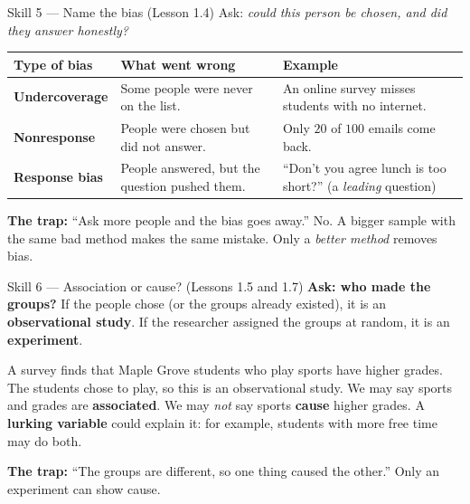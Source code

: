 \documentclass[10pt]{article}
\begin{document}
\vspace{3pt}
\boxguard[16]
\begin{notesbox}{Skill 5 --- Name the bias (Lesson 1.4)}
\small
Ask: \emph{could this person be chosen, and did they answer honestly?}

\vspace{2pt}
\renewcommand{\arraystretch}{1.2}
\begin{tabularx}{\linewidth}{@{} >{\bfseries}p{2.6cm} X X @{}}
\rowcolor{frost}
\textbf{Type of bias} & \textbf{What went wrong} & \textbf{Example} \\
\midrule
Undercoverage & Some people were never on the list. & An online survey misses students with
  no internet. \\
Nonresponse & People were chosen but did not answer. & Only $20$ of $100$ emails come back. \\
Response bias & People answered, but the question pushed them. & ``Don't you agree lunch is
  too short?'' (a \emph{leading} question) \\
\end{tabularx}

\vspace{3pt}
\textbf{The trap:} ``Ask more people and the bias goes away.'' No. A bigger sample with the
same bad method makes the same mistake. Only a \emph{better method} removes bias.
\end{notesbox}

\vspace{3pt}
\boxguard[16]
\begin{notesbox}{Skill 6 --- Association or cause? (Lessons 1.5 and 1.7)}
\small
\textbf{Ask: who made the groups?} If the people chose (or the groups already existed), it is
an \textbf{observational study}. If the researcher assigned the groups at random, it is an
\textbf{experiment}.

\vspace{2pt}
A survey finds that Maple Grove students who play sports have higher grades. The students chose
to play, so this is an observational study. We may say sports and grades are
\textbf{associated}. We may \emph{not} say sports \textbf{cause} higher grades. A
\textbf{lurking variable} could explain it: for example, students with more free time may do
both.

\vspace{2pt}
\textbf{The trap:} ``The groups are different, so one thing caused the other.'' Only an
experiment can show cause.
\end{notesbox}
\end{document}
